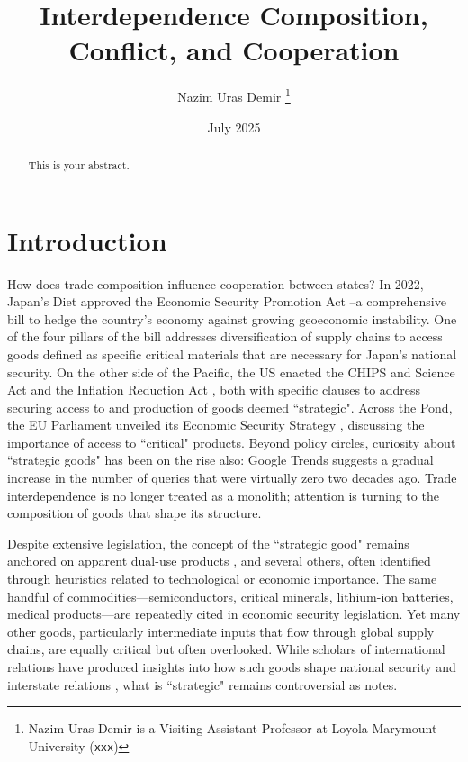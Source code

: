 \documentclass[12pt]{article}
\title{Interdependence Composition, Conflict, and Cooperation}
\author{Nazim Uras Demir \footnote{Nazim Uras Demir is a Visiting Assistant Professor at Loyola Marymount University (\texttt{xxx})}
 }
\date{July 2025}
\begin{document}
\maketitle

\begin{abstract}
This is your abstract. 
\end{abstract}

\newpage  %

\section{Introduction}
How does trade composition influence cooperation between states? In 2022, Japan's Diet approved the Economic Security Promotion Act \parencite{japanESPA2022}--a comprehensive bill to hedge the country's economy against growing geoeconomic instability. One of the four pillars of the bill addresses diversification of supply chains to access goods defined as specific critical materials that are necessary for Japan's national security. On the other side of the Pacific, the US enacted the CHIPS and Science Act \parencite{uscongresschips2022} and the Inflation Reduction Act \parencite{uscongressira2022}, both with specific clauses to address securing access to and production of goods deemed ``strategic". Across the Pond, the EU Parliament unveiled its Economic Security Strategy \parencite{eu2023economicsecurity}, discussing the importance of access to ``critical" products. Beyond policy circles, curiosity about ``strategic goods" has been on the rise also: Google Trends suggests a gradual increase in the number of queries that were virtually zero two decades ago. Trade interdependence is no longer treated as a monolith; attention is turning to the composition of goods that shape its structure.

Despite extensive legislation, the concept of the ``strategic good" remains anchored on apparent dual-use products \parencite{schelling2008arms}, and several others, often identified through heuristics related to technological or economic importance. The same handful of commodities—semiconductors, critical minerals, lithium-ion batteries, medical products—are repeatedly cited in economic security legislation. Yet many other goods, particularly intermediate inputs that flow through global supply chains, are equally critical but often overlooked. While scholars of international relations have produced insights into how such goods shape national security and interstate relations \parencites{drezner2021uses,ding2021logic,kim2024us, lee2024us, vekasi2021geoeconomics, gholz2021market, beaumier2024cross}, what is ``strategic" remains controversial as \textcite{baldwin2020statecraft} notes.
\end{document}
